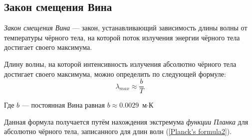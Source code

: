 \subsection{Закон смещения Вина}
\textit{Закон смещения Вина} --- закон, устанавливающий зависимость длины волны от температуры чёрного тела, на которой поток излучения энергии чёрного тела достигает своего максимума.

Длину волны, на которой интенсивность излучения абсолютно чёрного тела достигает своего максимума, можно определить по следующей формуле:
\begin{equation}
\lambda_{max}\approx\frac{b}{T}
\end{equation}

Где $b$ --- постоянная Вина равная $b\approx0.0029 $ $\text{м} \cdot \text{К}$

Данная формула получается путём нахождения экстремума \textit{функции Планка} для абсолютно чёрного тела, записанного для длин волн (\ref{Planck's formula2}).

